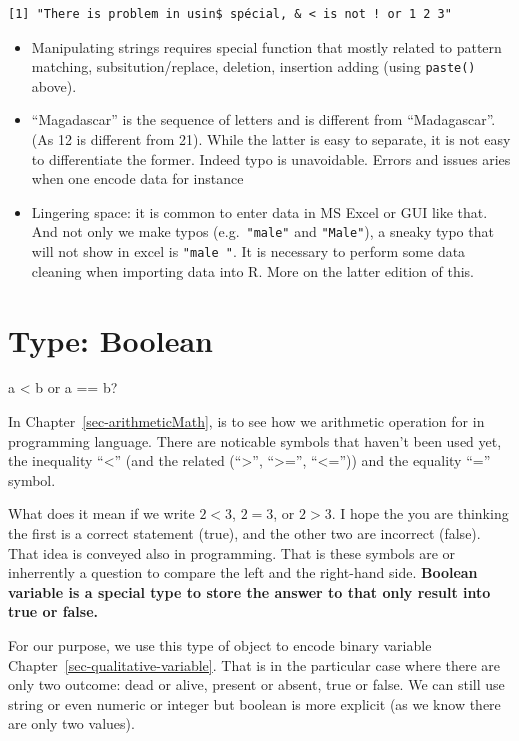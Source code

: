 \documentclass[
  letterpaper,
  DIV=11,
  numbers=noendperiod]{scrreprt}
\providecommand{\tightlist}{%
  \setlength{\itemsep}{0pt}\setlength{\parskip}{0pt}}
\begin{document}
\begin{verbatim}
[1] "There is problem in usin$ spécial, & < is not ! or 1 2 3"
\end{verbatim}

\begin{itemize}
\tightlist
\item
  Manipulating strings requires special function that mostly related to
  pattern matching, subsitution/replace, deletion, insertion adding
  (using \texttt{paste()} above).
\item
  ``Magadascar'' is the sequence of letters and is different from
  ``Madagascar''. (As 12 is different from 21). While the latter is easy
  to separate, it is not easy to differentiate the former. Indeed typo
  is unavoidable. Errors and issues aries when one encode data for
  instance
\item
  Lingering space: it is common to enter data in MS Excel or GUI like
  that. And not only we make typos (e.g.~\texttt{"male"} and
  \texttt{"Male"}), a sneaky typo that will not show in excel is
  \texttt{"male\ "}. It is necessary to perform some data cleaning when
  importing data into R. More on the latter edition of this.
\end{itemize}

\chapter{Type: Boolean}\label{sec-boolean}

a \textless{} b or a == b?

In Chapter~\ref{sec-arithmeticMath}, is to see how we arithmetic
operation for in programming language. There are noticable symbols that
haven't been used yet, the inequality ``\textless{}'' (and the related
(``\textgreater{}'', ``\textgreater='', ``\textless='')) and the
equality ``='' symbol.

What does it mean if we write \(2 < 3\), \(2 = 3\), or \(2 > 3\). I hope
the you are thinking the first is a correct statement (true), and the
other two are incorrect (false). That idea is conveyed also in
programming. That is these symbols are or inherrently a question to
compare the left and the right-hand side. \textbf{Boolean variable is a
special type to store the answer to that only result into true or
false.}

For our purpose, we use this type of object to encode binary variable
Chapter~\ref{sec-qualitative-variable}. That is in the particular case
where there are only two outcome: dead or alive, present or absent, true
or false. We can still use string or even numeric or integer but boolean
is more explicit (as we know there are only two values).
\end{document}
